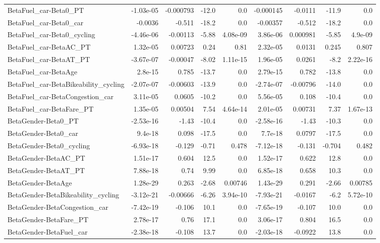\begin{tabular}{lrrrrrrrr}
BetaFuel_car-Beta0_PT & -1.03e-05 & -0.000793 & -12.0 & 0.0 & -0.000145 & -0.0111 & -11.9 & 0.0 \\
BetaFuel_car-Beta0_car & -0.0036 & -0.511 & -18.2 & 0.0 & -0.00357 & -0.512 & -18.2 & 0.0 \\
BetaFuel_car-Beta0_cycling & -4.46e-06 & -0.00113 & -5.88 & 4.08e-09 & 3.86e-06 & 0.000981 & -5.85 & 4.9e-09 \\
BetaFuel_car-BetaAC_PT & 1.32e-05 & 0.00723 & 0.24 & 0.81 & 2.32e-05 & 0.0131 & 0.245 & 0.807 \\
BetaFuel_car-BetaAT_PT & -3.67e-07 & -0.00047 & -8.02 & 1.11e-15 & 1.96e-05 & 0.0261 & -8.2 & 2.22e-16 \\
BetaFuel_car-BetaAge & 2.8e-15 & 0.785 & -13.7 & 0.0 & 2.79e-15 & 0.782 & -13.8 & 0.0 \\
BetaFuel_car-BetaBikeability_cycling & -2.07e-07 & -0.00603 & -13.9 & 0.0 & -2.74e-07 & -0.00796 & -14.0 & 0.0 \\
BetaFuel_car-BetaCongestion_car & 3.11e-05 & 0.0605 & -10.2 & 0.0 & 5.56e-05 & 0.108 & -10.4 & 0.0 \\
BetaFuel_car-BetaFare_PT & 1.35e-05 & 0.00504 & 7.54 & 4.64e-14 & 2.01e-05 & 0.00731 & 7.37 & 1.67e-13 \\
BetaGender-Beta0_PT & -2.53e-16 & -1.43 & -10.4 & 0.0 & -2.58e-16 & -1.43 & -10.3 & 0.0 \\
BetaGender-Beta0_car & 9.4e-18 & 0.098 & -17.5 & 0.0 & 7.7e-18 & 0.0797 & -17.5 & 0.0 \\
BetaGender-Beta0_cycling & -6.93e-18 & -0.129 & -0.71 & 0.478 & -7.12e-18 & -0.131 & -0.704 & 0.482 \\
BetaGender-BetaAC_PT & 1.51e-17 & 0.604 & 12.5 & 0.0 & 1.52e-17 & 0.622 & 12.8 & 0.0 \\
BetaGender-BetaAT_PT & 7.88e-18 & 0.74 & 9.99 & 0.0 & 6.85e-18 & 0.658 & 10.3 & 0.0 \\
BetaGender-BetaAge & 1.28e-29 & 0.263 & -2.68 & 0.00746 & 1.43e-29 & 0.291 & -2.66 & 0.00785 \\
BetaGender-BetaBikeability_cycling & -3.12e-21 & -0.00666 & -6.26 & 3.94e-10 & -7.93e-21 & -0.0167 & -6.2 & 5.72e-10 \\
BetaGender-BetaCongestion_car & -7.42e-19 & -0.106 & 10.1 & 0.0 & -7.65e-19 & -0.107 & 10.0 & 0.0 \\
BetaGender-BetaFare_PT & 2.78e-17 & 0.76 & 17.1 & 0.0 & 3.06e-17 & 0.804 & 16.5 & 0.0 \\
BetaGender-BetaFuel_car & -2.38e-18 & -0.108 & 13.7 & 0.0 & -2.03e-18 & -0.0922 & 13.8 & 0.0 \\

\end{tabular}
